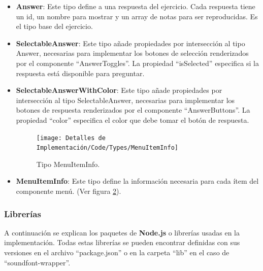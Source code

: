 \documentclass[12pt,twoside,titlepage]{report}
\begin{document}
\begin{itemize}
    \begin{figure}[H]
        \centering
        \texttt{[image: Detalles de Implementación/Code/Types/Answer]}
        \caption{Tipo Answer.}
        \label{fig:Answer}
    \end{figure}

    Cada variante de ejercicio utiliza los tipos Answer, SelectableAnswer y SelectableAnswerWithColor. (Ver figura \ref{fig:Answer}).

    \item \textbf{Answer}: Este tipo define a una respuesta del ejercicio. Cada respuesta tiene un id, un nombre para mostrar y un array de notas para ser reproducidas. Es el tipo base del ejercicio.
    \item \textbf{SelectableAnswer}: Este tipo añade propiedades por intersección al tipo Answer, necesarias para implementar los botones de selección renderizados por el componente ``AnswerToggles''. La propiedad ``isSelected'' especifica si la respuesta está disponible para preguntar.
    \item \textbf{SelectableAnswerWithColor}: Este tipo añade propiedades por intersección al tipo SelectableAnswer, necesarias para implementar los botones de respuesta renderizados por el componente ``AnswerButtons''. La propiedad ``color'' especifica el color que debe tomar el botón de respuesta.

    \begin{figure}[H]
        \centering
        \texttt{[image: Detalles de Implementación/Code/Types/MenuItemInfo]}
        \caption{Tipo MenuItemInfo.}
        \label{fig:MenuItemInfo}
    \end{figure}

    \item \textbf{MenuItemInfo}: Este tipo define la información necesaria para cada ítem del componente menú. (Ver figura \ref{fig:MenuItemInfo}).
\end{itemize}

\subsubsection{Librerías}
A continuación se explican los paquetes de \textbf{Node.js} o librerías usadas en la implementación. Todas estas librerías se pueden encontrar definidas con sus versiones en el archivo ``package.json'' o en la carpeta ``lib'' en el caso de ``soundfont-wrapper''.
\end{document}
